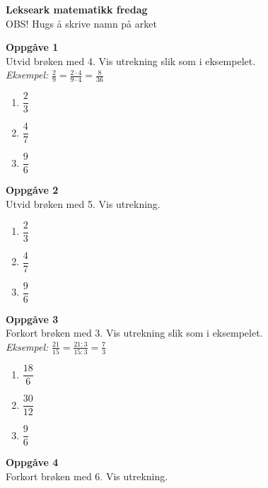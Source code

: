 \documentclass[english,hidelinks,pdftex, 11 pt, class=report,crop=false]{standalone}
\begin{document}
\huge \textbf{Lekseark matematikk fredag}\\
\footnotesize OBS! Hugs å skrive namn på arket \\[25pt]
\large

{\Large \textbf{Oppgåve 1}}\\[10pt]
Utvid brøken med 4. Vis utrekning slik som i eksempelet. \\[10pt]
\textit{Eksempel:} $ \displaystyle
\frac{2}{9}=\frac{2\cdot4}{9\cdot4}=\frac{8}{36}$ \\[10pt]
\begin{enumerate}[label=\alph*)]
	\item $\displaystyle \dfrac{2}{3} $\\[10pt]
	\item $\displaystyle \dfrac{4}{7}$\\[10pt]
	\item $\displaystyle \dfrac{9}{6} $\\[10pt]
\end{enumerate}

{\Large \textbf{Oppgåve 2}}\\[10pt]
Utvid brøken med 5. Vis utrekning. \\
\begin{enumerate}[label=\alph*)]
	\item $\displaystyle \dfrac{2}{3} $\\[10pt]
	\item $\displaystyle \dfrac{4}{7}$\\[10pt]
	\item $\displaystyle \dfrac{9}{6} $\\[10pt]	
\end{enumerate}
{\Large \textbf{Oppgåve 3}}\\[10pt]
Forkort brøken med 3. Vis utrekning slik som i eksempelet. \\[10pt]
\textit{Eksempel:} $ \displaystyle
\frac{21}{15}=\frac{21:3}{15:3}=\frac{7}{3}$ \\[10pt]
\begin{enumerate}[label=\alph*)]
	\item $\displaystyle \dfrac{18}{6} $\\[10pt]
	\item $\displaystyle \dfrac{30}{12}$\\[10pt]
	\item $\displaystyle \dfrac{9}{6} $
\end{enumerate}

\newpage
{\Large \textbf{Oppgåve 4}}\\[10pt]
Forkort brøken med 6. Vis utrekning. \\
\end{document}
